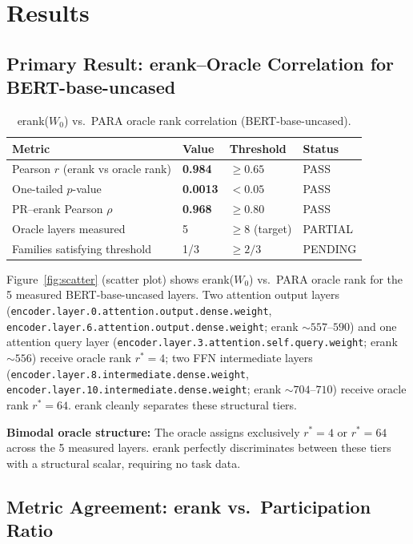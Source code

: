 \section{Results}
\label{sec:results}

\subsection{Primary Result: erank--Oracle Correlation for BERT-base-uncased}

\begin{table}[h]
\centering
\caption{erank($W_0$) vs.\ PARA oracle rank correlation (BERT-base-uncased).}
\label{tab:primary}
\begin{tabular}{llll}
\toprule
Metric & Value & Threshold & Status \\
\midrule
Pearson $r$ (erank vs oracle rank) & \textbf{0.984} & $\geq 0.65$ & PASS \\
One-tailed $p$-value & \textbf{0.0013} & $< 0.05$ & PASS \\
PR--erank Pearson $\rho$ & \textbf{0.968} & $\geq 0.80$ & PASS \\
Oracle layers measured & 5 & $\geq 8$ (target) & PARTIAL \\
Families satisfying threshold & 1/3 & $\geq 2/3$ & PENDING \\
\bottomrule
\end{tabular}
\end{table}

Figure~\ref{fig:scatter} (scatter plot) shows erank($W_0$) vs.\ PARA oracle rank for the 5 measured BERT-base-uncased layers. Two attention output layers (\texttt{encoder.layer.0.attention.output.dense.weight}, \texttt{encoder.layer.6.attention.output.dense.weight}; erank $\sim 557$--$590$) and one attention query layer (\texttt{encoder.layer.3.attention.self.query.weight}; erank $\sim 556$) receive oracle rank $r^* = 4$; two FFN intermediate layers (\texttt{encoder.layer.8.intermediate.dense.weight}, \texttt{encoder.layer.10.intermediate.dense.weight}; erank $\sim 704$--$710$) receive oracle rank $r^* = 64$. erank cleanly separates these structural tiers.

\textbf{Bimodal oracle structure:} The oracle assigns exclusively $r^* = 4$ or $r^* = 64$ across the 5 measured layers. erank perfectly discriminates between these tiers with a structural scalar, requiring no task data.

\subsection{Metric Agreement: erank vs.\ Participation Ratio}


